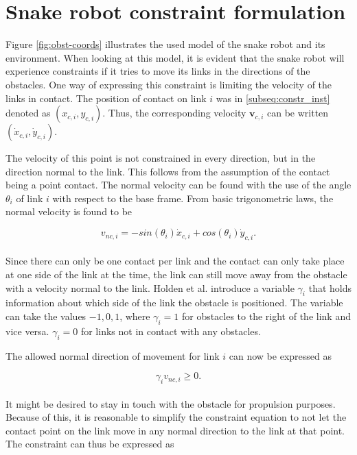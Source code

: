 \section{Snake robot constraint formulation}\label{seq:constraints}

Figure \ref{fig:obst-coords} illustrates the used model of the snake robot and its environment. When looking at this model, it is evident that the snake robot will experience constraints if it tries to move its links in the directions of the obstacles. One way of expressing this constraint is limiting the velocity of the links in contact. The position of contact on link $i$ was in \ref{subseq:constr_inst} denoted as $(x_{c,i}, y_{c,i})$. Thus, the corresponding velocity $\mathbf{v}_{c,i}$ can be written $(\dot{x}_{c,i}, \dot{y}_{c,i})$.

The velocity of this point is not constrained in every direction, but in the direction normal to the link. This follows from the assumption of the contact being a point contact. The normal velocity can be found with the use of the angle $\theta_i$ of link $i$ with respect to the base frame. From basic trigonometric laws, the normal velocity is found to be

\begin{equation}\label{eq:norm_vel}
    v_{nc,i} = -sin(\theta_i) \dot{x}_{c,i} + cos(\theta_i) \dot{y}_{c,i}.
\end{equation}
\\
Since there can only be one contact per link and the contact can only take place at one side of the link at the time, the link can still move away from the obstacle with a velocity normal to the link. Holden et al. \cite{holden2014optimal} introduce a variable $\gamma_i$ that holds information about which side of the link the obstacle is positioned. The variable can take the values ${-1, 0, 1}$, where $\gamma_i=1$ for obstacles to the right of the link and vice versa. $\gamma_i=0$ for links not in contact with any obstacles.

The allowed normal direction of movement for link $i$ can now be expressed as

\begin{equation}\label{eq:norm_vel2}
    \gamma_i v_{nc,i} \geq 0.
\end{equation}
\\
It might be desired to stay in touch with the obstacle for propulsion purposes. Because of this, it is reasonable to simplify the constraint equation to not let the contact point on the link move in any normal direction to the link at that point. The constraint can thus be expressed as


